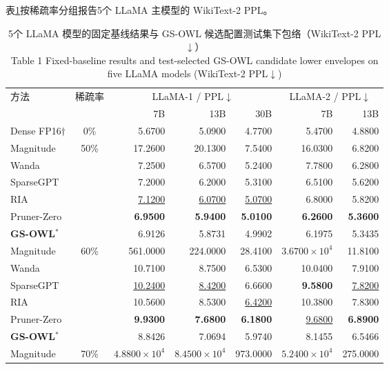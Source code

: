 \documentclass[UTF8,fontset=fandol]{ctexart}
\renewcommand{\arraystretch}{1.08}
\newcommand{\best}[1]{\textbf{#1}}
\newcommand{\second}[1]{\underline{#1}}
\begin{document}
表\ref{tab:ppl}按稀疏率分组报告5个 LLaMA 主模型的 WikiText-2 PPL。

\begin{table}[!htbp]
\centering
\caption{5个 LLaMA 模型的固定基线结果与 GS-OWL 候选配置测试集下包络（WikiText-2 PPL$\downarrow$）\\
Table 1 Fixed-baseline results and test-selected GS-OWL candidate lower envelopes on five LLaMA models (WikiText-2 PPL$\downarrow$)}
\label{tab:ppl}
\scriptsize
\setlength{\tabcolsep}{4.2pt}
\renewcommand{\arraystretch}{0.96}
\begin{tabular*}{0.98\textwidth}{@{\extracolsep{\fill}}lcrrrrr@{}}
\toprule
\multirow{2}{*}{方法} & \multirow{2}{*}{稀疏率} &
\multicolumn{3}{c}{LLaMA-1 / PPL$\downarrow$} & \multicolumn{2}{c}{LLaMA-2 / PPL$\downarrow$} \\
\cmidrule(lr){3-5}\cmidrule(lr){6-7}
 & & 7B & 13B & 30B & 7B & 13B \\
\midrule
Dense FP16$\dagger$ & 0\% & 5.6700 & 5.0900 & 4.7700 & 5.4700 & 4.8800 \\
\midrule
Magnitude & \multirow{6}{*}{50\%} & 17.2600 & 20.1300 & 7.5400 & 16.0300 & 6.8200 \\
Wanda & & 7.2500 & 6.5700 & 5.2400 & 7.7800 & 6.2800 \\
SparseGPT & & 7.2000 & 6.2000 & 5.3100 & 6.5100 & 5.6200 \\
RIA & & \second{7.1200} & \second{6.0700} & \second{5.0700} & 6.8000 & 5.8200 \\
Pruner-Zero & & \best{6.9500} & \best{5.9400} & \best{5.0100} & \best{6.2600} & \best{5.3600} \\
\textbf{GS-OWL}$^\ast$ & & 6.9126 & 5.8731 & 4.9902 & 6.1975 & 5.3435 \\
\midrule
Magnitude & \multirow{6}{*}{60\%} & 561.0000 & 224.0000 & 28.4100 & $3.6700\times10^4$ & 11.8100 \\
Wanda & & 10.7100 & 8.7500 & 6.5300 & 10.0400 & 7.9100 \\
SparseGPT & & \second{10.2400} & \second{8.4200} & 6.6600 & \best{9.5800} & \second{7.8200} \\
RIA & & 10.5600 & 8.5300 & \second{6.4200} & 10.3800 & 7.8300 \\
Pruner-Zero & & \best{9.9300} & \best{7.6800} & \best{6.1800} & \second{9.6800} & \best{6.8900} \\
\textbf{GS-OWL}$^\ast$ & & 8.8426 & 7.0694 & 5.9740 & 8.1455 & 6.5466 \\
\midrule
  Magnitude & \multirow{11}{*}{70\%} & $4.8800\times10^4$ & $8.4500\times10^4$ & 973.0000 & $5.2400\times10^4$ & 275.0000 \\

\end{tabular*}
\end{table}
\end{document}
